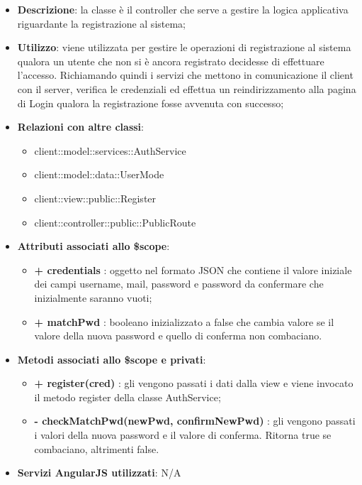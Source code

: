 			\begin{itemize}
				\item \textbf{Descrizione}: la classe è il controller che serve a gestire la logica applicativa riguardante la registrazione al sistema;
				\item \textbf{Utilizzo}: viene utilizzata per gestire le operazioni di registrazione al sistema qualora un utente che non si è ancora registrato decidesse di effettuare l'accesso. Richiamando quindi i servizi che mettono in comunicazione il client con il server, verifica le credenziali ed effettua un reindirizzamento alla pagina di Login qualora la registrazione fosse avvenuta con successo;
				\item \textbf{Relazioni con altre classi}:
					\begin{itemize}
						\item client::model::services::AuthService
						\item client::model::data::UserMode
						\item client::view::public::Register
						\item client::controller::public::PublicRoute
					\end{itemize}
				\item \textbf{Attributi associati allo \$scope}:
					\begin{itemize}
						\item \textbf{+ credentials} : oggetto nel formato JSON che contiene il valore iniziale dei campi username, mail, password e password da confermare che inizialmente saranno vuoti;
						\item \textbf{+ matchPwd} : booleano inizializzato a false che cambia valore se il valore della nuova password e quello di conferma non combaciano.
					\end{itemize}

				\item \textbf{Metodi associati allo \$scope e privati}:
					\begin{itemize}
						\item \textbf{+ register(cred)} : gli vengono passati i dati dalla view e viene invocato il metodo register della classe AuthService;
						\item \textbf{- checkMatchPwd(newPwd, confirmNewPwd)} : gli vengono passati i valori della nuova password e il valore di conferma. Ritorna true se combaciano, altrimenti false.
					\end{itemize}

				\item \textbf{Servizi AngularJS utilizzati}: N/A

			\end{itemize}

